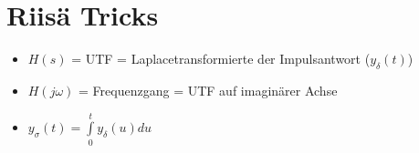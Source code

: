 \section{Riisä Tricks}
\begin{itemize}
  \item $H(s)$ = UTF = Laplacetransformierte der Impulsantwort ($y_\delta(t)$)
  \item $H(j \omega)$ = Frequenzgang = UTF auf imaginärer Achse
  \item $y_\sigma(t) = \int\limits_0^t y_\delta(u)du$
\end{itemize}
